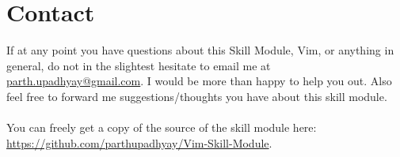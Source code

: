 \section{Contact}
If at any point you have questions about this Skill Module, Vim, or anything
in general, do not in the slightest hesitate to email me at 
\url{parth.upadhyay@gmail.com}. I would be more than happy to help you out.
Also feel free to forward me suggestions/thoughts you have about this skill module.
\\\\
You can freely get a copy of the source of the skill module here:
\url{https://github.com/parthupadhyay/Vim-Skill-Module}.


